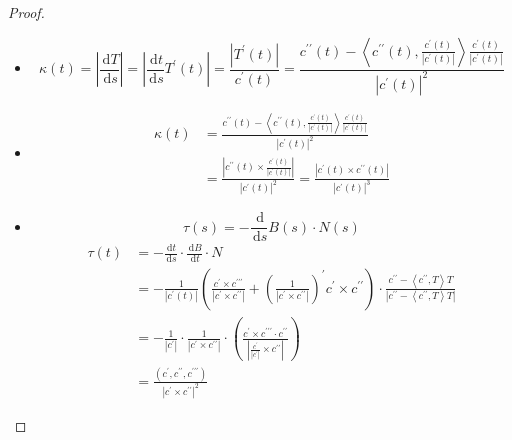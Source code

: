 \documentclass[../../古典微分几何.tex]{subfiles}
\begin{document}
\begin{proof}
\begin{itemize}
        \item \[
         \kappa  \left( t \right)= \left| \frac{\,\mathrm{d} T }{\,\mathrm{d} s }  \right|=  \left|  \frac{\,\mathrm{d} t }{\,\mathrm{d} s }T^{\prime} \left( t \right)   \right|=  \frac{\left| T^{\prime} \left( t \right)  \right|  }{c^{\prime} \left( t \right)  }    = \frac{c ^{\prime \prime} \left( t \right)- \left<c ^{\prime \prime} \left( t \right), \frac{c^{\prime} \left( t \right)  }{\left| c^{\prime} \left( t \right)  \right|  }     \right> \frac{c^{\prime} \left( t \right)  }{\left| c^{\prime} \left( t \right)  \right|  }   }{ \left| c^{\prime} \left( t \right)  \right|^{2} } 
        \]
        \item \[
            \begin{aligned}
              \kappa  \left( t \right)& = \frac{c ^{\prime \prime} \left( t \right)- \left<c ^{\prime \prime} \left( t \right), \frac{c^{\prime} \left( t \right)  }{\left| c^{\prime} \left( t \right)  \right|  }     \right> \frac{c^{\prime} \left( t \right)  }{\left| c^{\prime} \left( t \right)  \right|  }   }{ \left| c^{\prime} \left( t \right)  \right|^{2} } \\ 
               & = \frac{\left| c ^{\prime \prime} \left( t \right)\times  \frac{c^{\prime} \left( t \right)  }{\left| c ^{\prime} \left( t \right)  \right|  }   \right|  }{\left| c^{\prime} \left( t \right)  \right|^{2}  }  =  \frac{\left| c^{\prime} \left( t \right)\times  c ^{\prime \prime} \left( t \right)   \right|  }{\left| c^{\prime} \left( t \right)  \right|^{3}  } 
            \end{aligned}
             \]

        
        \item \[
        \tau \left( s \right)=  - \frac{\,\mathrm{d}  }{\,\mathrm{d} s }B\left( s \right)\cdot N\left( s \right)    
        \] \[
      \begin{aligned}
        \tau \left( t \right)& =  -\frac{\,\mathrm{d} t }{\,\mathrm{d} s }  \cdot  \frac{\,\mathrm{d} B }{\,\mathrm{d} t }\cdot N\\ 
         & =  - \frac{1}{\left| c^{\prime} \left( t \right)  \right| }  \left(  \frac{c^{\prime} \times  c ^{\prime \prime \prime}   }{\left| c^{\prime} \times  c ^{\prime \prime}  \right|  } +  \left(  \frac{1}{\left| c^{\prime} \times c ^{\prime \prime}  \right| } \right)^{\prime}  c^{\prime} \times  c ^{\prime \prime}   \right) \cdot  \frac{c ^{\prime \prime} - \left<c ^{\prime \prime} ,T \right>T }{\left| c ^{\prime \prime} - \left<c ^{\prime \prime} ,T \right>T \right|  }\\ 
          & =  - \frac{1}{\left| c^{\prime}  \right| }\cdot  \frac{1}{\left| c^{\prime}  \times  c ^{\prime \prime}  \right| }\cdot   \left(  \frac{c ^{\prime}  \times  c ^{\prime \prime\prime} \cdot c ^{\prime \prime}   }{ \left|\frac{c^{\prime}  }{\left| c^{\prime}  \right|  }  \times  c ^{\prime \prime}  \right| }  \right) \\ 
           & =  \frac{\left(   c^{\prime} , c ^{\prime \prime} , c ^{\prime \prime\prime}  \right)  }{\left| c^{\prime} \times  c ^{\prime \prime}  \right|^{2}  } 
      \end{aligned}
        \]
        

\end{itemize}
\end{proof}
\end{document}
